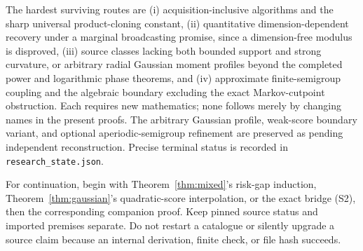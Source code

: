 \documentclass[11pt]{article}
\begin{document}
The hardest surviving routes are (i) acquisition-inclusive algorithms and the sharp universal product-cloning constant, (ii) quantitative dimension-dependent recovery under a marginal broadcasting promise, since a dimension-free modulus is disproved, (iii) source classes lacking both bounded support and strong curvature, or arbitrary radial Gaussian moment profiles beyond the completed power and logarithmic phase theorems, and (iv) approximate finite-semigroup coupling and the algebraic boundary excluding the exact Markov-cutpoint obstruction. Each requires new mathematics; none follows merely by changing names in the present proofs. The arbitrary Gaussian profile, weak-score boundary variant, and optional aperiodic-semigroup refinement are preserved as pending independent reconstruction. Precise terminal status is recorded in \texttt{research\_state.json}.

For continuation, begin with Theorem~\ref{thm:mixed}'s risk-gap induction, Theorem~\ref{thm:gaussian}'s quadratic-score interpolation, or the exact bridge (S2), then the corresponding companion proof. Keep pinned source status and imported premises separate. Do not restart a catalogue or silently upgrade a source claim because an internal derivation, finite check, or file hash succeeds.
\end{document}

